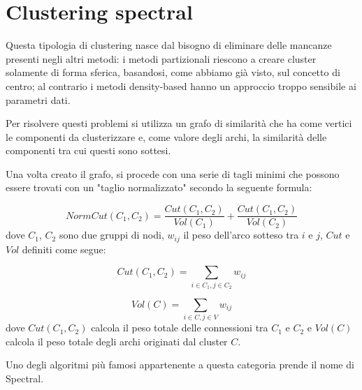 \section{Clustering spectral}
	Questa tipologia di clustering nasce dal bisogno di eliminare delle mancanze presenti negli altri metodi: i metodi partizionali riescono a creare cluster solamente di forma sferica, basandosi, come abbiamo già visto, sul concetto di centro; al contrario i metodi density-based hanno un approccio troppo sensibile ai parametri dati.

	Per risolvere questi problemi si utilizza un grafo di similarità che ha come vertici le componenti da clusterizzare e, come valore degli archi, la similarità delle componenti tra cui questi sono sottesi.

	Una volta creato il grafo, si procede con una serie di tagli minimi che possono essere trovati con un "taglio normalizzato" secondo la seguente formula:

	\begin{equation*}
		NormCut(C_1, C_2) =  \frac{Cut(C_1, C_2)}{Vol(C_1)} + \frac{Cut(C_1, C_2)}{Vol(C_2)}
	\end{equation*}
	dove $C_1$, $C_2$ sono due gruppi di nodi,  $w_{ij}$ il peso dell'arco sotteso tra $i$ e $j$, $Cut$ e $Vol$ definiti come segue:

	\begin{equation*}
		Cut(C_1, C_2) = \sum_{i \in C_1, j \in C_2} {w_{ij}}
	\end{equation*}

	\begin{equation*}
		Vol(C) = \sum_{i \in C, j \in V} {w_{ij}}
	\end{equation*}
	dove $Cut(C_1, C_2)$ calcola il peso totale delle connessioni tra $C_1$ e $C_2$ e $Vol(C)$ calcola il peso totale degli archi originati dal cluster $C$.

	Uno degli algoritmi più famosi appartenente a questa categoria prende il nome di Spectral\cite{spectral}.